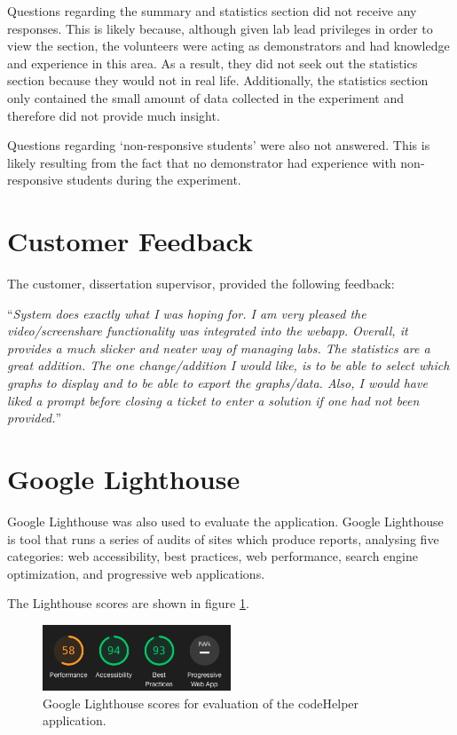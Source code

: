 Questions regarding the summary and statistics section did not receive any responses. This is likely because, although given lab lead privileges in order to view the section, the volunteers were acting as demonstrators and had knowledge and experience in this area. As a result, they did not seek out the statistics section because they would not in real life. Additionally, the statistics section only contained the small amount of data collected in the experiment and therefore did not provide much insight.

Questions regarding `non-responsive students' were also not answered. This is likely resulting from the fact that no demonstrator had experience with non-responsive students during the experiment.

\newpage
\section{Customer Feedback} 

The customer, dissertation supervisor, provided the following feedback:

``\textit{System does exactly what I was hoping for. I am very pleased the video/screenshare functionality was integrated into the webapp. Overall, it provides a much slicker and neater way of managing labs. The statistics are a great addition. The one change/addition I would like, is to be able to select which graphs to display and to be able to export the graphs/data. Also, I would have liked a prompt before closing a ticket to enter a solution if one had not been provided.}''

\newpage
\section{Google Lighthouse}

Google Lighthouse \cite{Lighthouse} was also used to evaluate the application. Google Lighthouse is tool that runs a series of audits of sites which produce reports, analysing five categories: web accessibility, best practices, web performance, search engine optimization, and progressive web applications.

The Lighthouse scores are shown in figure \ref{fig:lighthouse}.

\begin{figure}[H]
    \centering
    \includegraphics[width=0.5\textwidth]{10evaluation/images/lighthouse.png}
    \caption{Google Lighthouse scores for evaluation of the codeHelper application.}
    \label{fig:lighthouse}
\end{figure}

